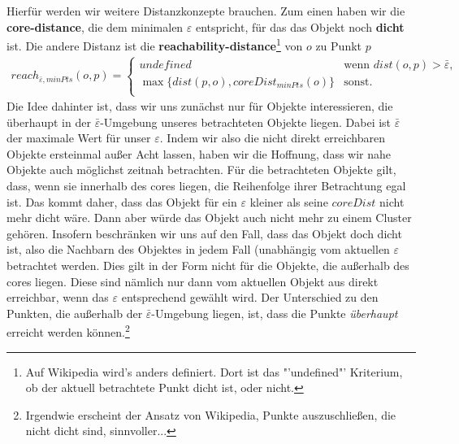 Hierfür werden wir weitere Distanzkonzepte brauchen. Zum einen haben wir die
\textbf{core-distance}, die dem minimalen \(\varepsilon\) entspricht,
für das das Objekt noch \textbf{dicht} ist. Die andere Distanz ist die
\textbf{reachability-distance}\footnote{Auf Wikipedia wird's anders definiert.
Dort ist das "'undefined"' Kriterium, ob der aktuell betrachtete Punkt dicht ist,
oder nicht.}
von \(o\) zu Punkt \(p\)
\begin{align*}
 reach_{\bar{\varepsilon} , minPts}(o,p) = 
 \begin{cases}
 undefined & \text{wenn } dist(o,p) >\bar{\varepsilon},\\
\max \{dist(p,o), coreDist_{minPts}(o)\} & \text{sonst.}\\ %
\end{cases}
\end{align*}
Die Idee dahinter ist, dass wir uns zunächst nur für Objekte interessieren,
die überhaupt in der \(\bar{\varepsilon}\)-Umgebung unseres betrachteten
Objekte liegen. Dabei ist \(\bar{\varepsilon}\) der maximale Wert für
unser \(\varepsilon\). Indem wir also die nicht direkt erreichbaren Objekte
ersteinmal außer Acht lassen, haben wir die Hoffnung, dass wir nahe Objekte
auch möglichst zeitnah betrachten. Für die betrachteten Objekte gilt, dass,
wenn sie innerhalb des cores liegen, die Reihenfolge ihrer Betrachtung egal ist.
Das kommt daher, dass das Objekt für ein \(\varepsilon\) kleiner als seine
\(coreDist\) nicht mehr dicht wäre. Dann aber würde das Objekt auch nicht
mehr zu einem Cluster gehören. Insofern beschränken wir uns auf den
Fall, dass das Objekt doch dicht ist, also die Nachbarn des Objektes in
jedem Fall (unabhängig vom aktuellen \(\varepsilon\) betrachtet werden.
Dies gilt in der Form nicht für die Objekte, die außerhalb des cores liegen.
Diese sind nämlich nur dann vom aktuellen Objekt aus direkt erreichbar, wenn
das \(\varepsilon\) entsprechend gewählt wird. Der Unterschied zu den Punkten,
die außerhalb der \(\bar{\varepsilon}\)-Umgebung liegen, ist, dass die Punkte
\textit{überhaupt} erreicht werden können.\footnote{Irgendwie erscheint der
Ansatz von Wikipedia, Punkte auszuschließen, die nicht dicht sind, sinnvoller...}

